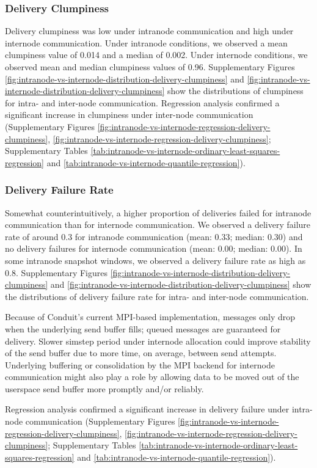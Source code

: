 \subsubsection{Delivery Clumpiness}

Delivery clumpiness was low under intranode communication and high under internode communication.
Under intranode conditions, we observed a mean clumpiness value of 0.014 and a median of 0.002.
Under internode conditions, we observed mean and median clumpiness values of 0.96.
Supplementary Figures \ref{fig:intranode-vs-internode-distribution-delivery-clumpiness} and \ref{fig:intranode-vs-internode-distribution-delivery-clumpiness} show the distributions of clumpiness for intra- and inter-node communication.
Regression analysis confirmed a significant increase in clumpiness under inter-node communication (Supplementary Figures \ref{fig:intranode-vs-internode-regression-delivery-clumpiness}, \ref{fig:intranode-vs-internode-regression-delivery-clumpiness}; Supplementary Tables \ref{tab:intranode-vs-internode-ordinary-least-squares-regression} and \ref{tab:intranode-vs-internode-quantile-regression}).

\subsubsection{Delivery Failure Rate}

Somewhat counterintuitively, a higher proportion of deliveries failed for intranode communication than for internode communication.
We observed a delivery failure rate of around 0.3 for intranode communication (mean: 0.33; median: 0.30) and no delivery failures for internode communication (mean: 0.00; median: 0.00).
In some intranode snapshot windows, we observed a delivery failure rate as high as 0.8.
Supplementary Figures \ref{fig:intranode-vs-internode-distribution-delivery-clumpiness} and \ref{fig:intranode-vs-internode-distribution-delivery-clumpiness} show the distributions of delivery failure rate for intra- and inter-node communication.

Because of Conduit's current MPI-based implementation, messages only drop when the underlying send buffer fills; queued messages are guaranteed for delivery.
Slower simstep period under internode allocation could improve stability of the send buffer due to more time, on average, between send attempts.
Underlying buffering or consolidation by the MPI backend for internode communication might also play a role by allowing data to be moved out of the userspace send buffer more promptly and/or reliably.

Regression analysis confirmed a significant increase in delivery failure under intra-node communication (Supplementary Figures \ref{fig:intranode-vs-internode-regression-delivery-clumpiness}, \ref{fig:intranode-vs-internode-regression-delivery-clumpiness}; Supplementary Tables \ref{tab:intranode-vs-internode-ordinary-least-squares-regression} and \ref{tab:intranode-vs-internode-quantile-regression}).
